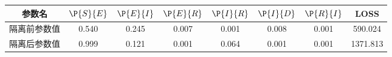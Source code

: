 \begin{tabular}{cccccccc}
\hline
参数名&$\P{S}{E}$&$\P{E}{I}$&$\P{E}{R}$&$\P{I}{R}$&$\P{I}{D}$&$\P{R}{I}$&LOSS\\
\hline
隔离前参数值&0.540&0.245&0.007&0.001&0.008&0.001&590.024\\
隔离后参数值&0.999&0.121&0.001&0.064&0.001&0.001&1371.813\\
\hline
\end{tabular}